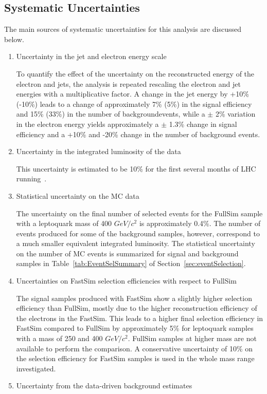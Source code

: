 \documentclass{cmspaper}
\begin{document}
\begin{linenumbers}
\section{Systematic Uncertainties} \label{sec:Systematics}

The main sources of systematic uncertainties for this analysis are discussed below.

%
\begin{enumerate}
\item Uncertainty in the jet and electron energy scale

To quantify the effect of the uncertainty on the reconstructed energy of the electron and jets,
the analysis is repeated rescaling the electron and jet energies
 with a multiplicative factor. 
A change in the jet energy by +10\% (-10\%) leads to a change of approximately 
7\% (5\%) in the signal efficiency and 15\% (33\%) in the number of backgroundevents, 
while a $\pm$ 2\% variation in the electron energy yields approximately a $\pm$ 1.3\%  
change in signal efficiency and a +10\% and -20\% change in the number of background events. 
%
\item Uncertainty in the integrated luminosity of the data

This uncertainty is estimated to be 10\% for the first several months of LHC running~\cite{PTDR}. 
%
\item Statistical uncertainty on the MC data

The uncertainty on the final number of selected events for the FullSim sample with a leptoquark mass of 400 $GeV/c^2$ is 
approximately 0.4\%.  The number of events produced 
for some of the background samples, however, correspond to a much
smaller equivalent integrated luminosity.  
The statistical uncertainty on the number of MC events is summarized for signal and background samples 
in Table~\ref{tab:EventSelSummary} of Section~\ref{sec:eventSelection}.  
%
\item Uncertainties on FastSim selection efficiencies with respect to FullSim

The signal samples produced with FastSim show a slightly higher selection efficiency than FullSim, 
mostly due to the higher reconstruction efficiency of the electrons in the FastSim. 
This leads to a higher final selection efficiency in FastSim compared to FullSim by approximately 5\% 
for leptoquark samples with a mass of 250 and 400 $GeV/c^2$. FullSim samples at higher mass are not available 
to perform the comparison. A conservative uncertainty of 10\% on the selection efficiency 
for FastSim samples is used in the whole mass range investigated. 
%
\item Uncertainty from the data-driven background estimates


\end{enumerate}
\end{linenumbers}
\end{document}
